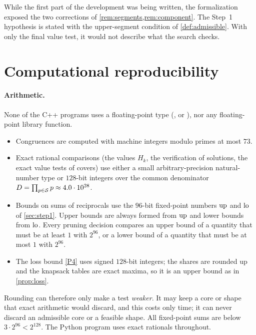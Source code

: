 \documentclass[11pt]{article}
\begin{document}
While the first part of the development was being written, the formalization exposed the two corrections of \cref{rem:segments,rem:component}. The Step~1 hypothesis is stated with the upper-segment condition of \cref{def:admissible}. With only the final value test, it would not describe what the search checks.

\section{Computational reproducibility}\label{sec:repro}

\paragraph{Arithmetic.}
None of the C++ programs uses a floating-point type (,  or ), nor any floating-point library function.
\begin{itemize}
\item Congruences are computed with machine integers modulo primes at most $73$.
\item Exact rational comparisons (the values $H_k$, the verification of solutions, the exact value tests of covers) use either a small arbitrary-precision natural-number type or $128$-bit integers over the common denominator $D=\prod_{p\in\mathcal{S}}p\approx4.0\cdot10^{28}$.
\item Bounds on sums of reciprocals use the $96$-bit fixed-point numbers $\operatorname{up}$ and $\operatorname{lo}$ of \cref{sec:step1}. Upper bounds are always formed from $\operatorname{up}$ and lower bounds from $\operatorname{lo}$. Every pruning decision compares an upper bound of a quantity that must be at least $1$ with $2^{96}$, or a lower bound of a quantity that must be at most $1$ with $2^{96}$.
\item The loss bound \ref{P4} uses signed $128$-bit integers; the shares are rounded up and the knapsack tables are exact maxima, so it is an upper bound as in \cref{prop:loss}.
\end{itemize}
Rounding can therefore only make a test \emph{weaker}. It may keep a core or shape that exact arithmetic would discard, and this costs only time; it can never discard an admissible core or a feasible shape. All fixed-point sums are below $3\cdot2^{96}<2^{128}$.
The Python program uses exact rationals throughout.
\end{document}
